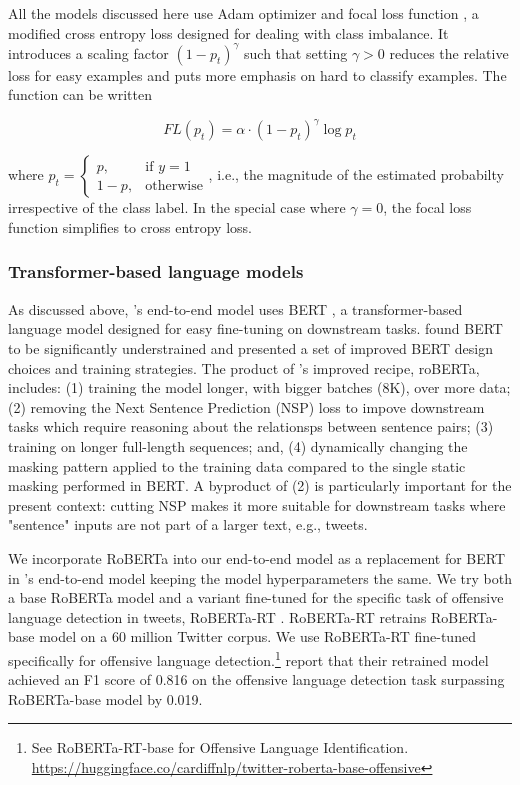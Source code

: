 \documentclass[letterpaper]{article} %
\begin{document}
All the models discussed here use Adam optimizer \citep{Kingma2014} and focal loss function \citep{lin2017focal}, a modified cross entropy loss designed for dealing with class imbalance. It introduces a scaling factor $(1-p_t)^\gamma$ such that setting $\gamma > 0$ reduces the relative loss for easy examples and puts more emphasis on hard to classify examples. The function can be written

$$
FL(p_t) = \alpha \cdot (1 - p_t)^\gamma \log{p_t}
$$

where $p_t = \begin{cases} p, & \text{if } y =1 \\ 1-p, & \text{otherwise}  \end{cases}$, i.e., the magnitude of the estimated probabilty irrespective of the class label. In the special case where $\gamma=0$, the focal loss function simplifies to cross entropy loss.

\subsubsection{Transformer-based language models}

As discussed above, \citet{Miao2022}'s end-to-end model uses BERT \citep{Devlin2018}, a transformer-based language model designed for easy fine-tuning on downstream tasks\citep{Devlin2018}. \citet{Liu2019} found BERT to be significantly understrained and presented a set of improved BERT design choices and training strategies. The product of \citet{Liu2019}'s improved recipe, roBERTa, includes: (1) training the model longer, with bigger batches (8K), over more data; (2) removing the Next Sentence Prediction (NSP) loss to impove downstream tasks which require reasoning about the relationsps between sentence pairs; (3) training on longer full-length sequences; and, (4) dynamically changing the masking pattern applied to the training data compared to the single static masking performed in BERT. A byproduct of (2) is particularly important for the present context: cutting NSP makes it more suitable for downstream tasks where "sentence" inputs are not part of a larger text, e.g., tweets.

We incorporate RoBERTa into our end-to-end model as a replacement for BERT in \citet{Miao2022}'s end-to-end model keeping the model hyperparameters the same. We try both a base RoBERTa model and a variant fine-tuned for the specific task of offensive language detection in tweets, RoBERTa-RT \citep{Barbieri2020}. RoBERTa-RT retrains RoBERTa-base model on a 60 million Twitter corpus. We use RoBERTa-RT fine-tuned specifically for offensive language detection.\footnote{See RoBERTa-RT-base for Offensive Language Identification. \url{https://huggingface.co/cardiffnlp/twitter-roberta-base-offensive}} \citet{Barbieri2020} report that their retrained model achieved an F1 score of 0.816 on the offensive language detection task surpassing RoBERTa-base model by 0.019.
\end{document}
